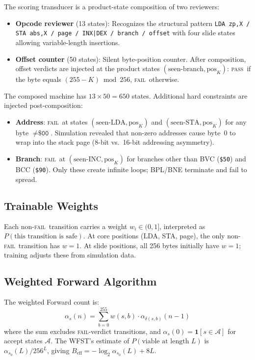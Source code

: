 \documentclass{article}
\newcommand{\hex}[1]{\texttt{\$#1}}
\newcommand{\Beff}{B_{\mathrm{eff}}}
\newcommand{\PASS}{\textsc{pass}}
\newcommand{\FAIL}{\textsc{fail}}
\begin{document}
The scoring transducer is a product-state composition of two reviewers:

\begin{itemize}
\item \textbf{Opcode reviewer} (13 states): Recognizes the structural
  pattern \texttt{LDA~zp,X / STA~abs,X / page / INX|DEX / branch / offset}
  with four slide states allowing variable-length insertions.

\item \textbf{Offset counter} (50 states): Silent byte-position counter.
  After composition, offset verdicts are injected at the product states
  $(\text{seen-branch}, \text{pos}_K)$: \PASS\ if the byte equals
  $(255 - K) \bmod 256$, \FAIL\ otherwise.
\end{itemize}

The composed machine has $13 \times 50 = 650$ states. Additional hard
constraints are injected post-composition:
\begin{itemize}
\item \textbf{Address}: \FAIL\ at states $(\text{seen-LDA}, \text{pos}_K)$
  and $(\text{seen-STA}, \text{pos}_K)$ for any byte $\neq \hex{00}$.
  Simulation revealed that non-zero addresses cause byte~0 to wrap
  into the stack page (8-bit vs.\ 16-bit addressing asymmetry).
\item \textbf{Branch}: \FAIL\ at $(\text{seen-INC}, \text{pos}_K)$
  for branches other than BVC (\hex{50}) and BCC (\hex{90}). Only
  these create infinite loops; BPL/BNE terminate and fail to spread.
\end{itemize}

\subsection{Trainable Weights}

Each non-\FAIL\ transition carries a weight $w_i \in (0, 1]$,
interpreted as $P(\text{this transition is safe})$. At core positions
(LDA, STA, page), the only non-\FAIL\ transition has $w = 1$.
At slide positions, all 256 bytes initially have $w = 1$; training
adjusts these from simulation data.

\subsection{Weighted Forward Algorithm}

The weighted Forward count is:
\begin{equation}
\alpha_s(n) = \sum_{b=0}^{255} w(s, b) \cdot \alpha_{\delta(s,b)}(n-1)
\end{equation}
where the sum excludes \FAIL-verdict transitions, and
$\alpha_s(0) = \mathbf{1}[s \in \mathcal{A}]$ for accept states
$\mathcal{A}$. The WFST's estimate of $P(\text{viable at length } L)$
is $\alpha_{s_0}(L) / 256^L$, giving
$\Beff = -\log_2 \alpha_{s_0}(L) + 8L$.
\end{document}
